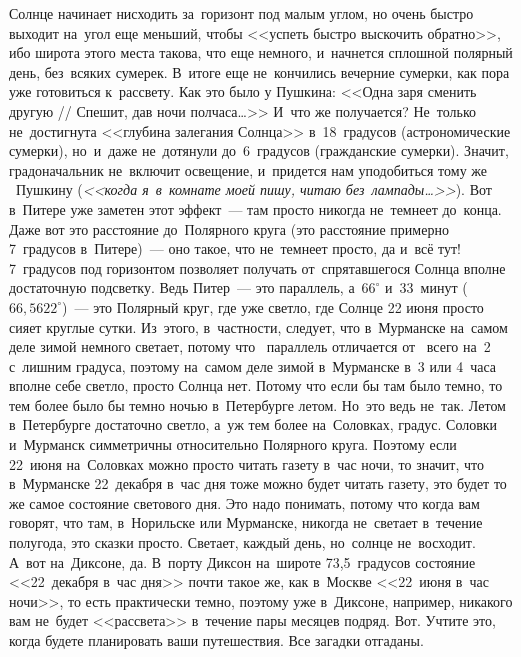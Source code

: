 Солнце начинает нисходить за~горизонт под малым углом, но очень быстро выходит на~угол еще меньший,
чтобы <<успеть быстро выскочить обратно>>, ибо широта этого места такова, что еще немного,
и~начнется сплошной полярный день, без~всяких сумерек. В~итоге еще не~кончились вечерние сумерки,
как пора уже готовиться к~рассвету.
Как это было у Пушкина: <<Одна заря сменить другую // Спешит, дав ночи полчаса\ldots>>
 И~что же получается? Не~только не~достигнута <<глубина
залегания Солнца>> в~18~градусов (астрономические сумерки), но~и~даже не~дотянули до~6~градусов
(гражданские сумерки). Значит, градоначальник не~включит освещение, и~придется нам уподобиться тому же ~Пушкину
(\textit{<<когда я~в~комнате моей пишу, читаю без~лампады\ldots>>}).
 Вот в~Питере уже заметен этот
эффект~--- там просто никогда не~темнеет до~конца. Даже вот это расстояние до~Полярного круга (это
расстояние примерно 7~градусов в~Питере)~--- оно такое, что не~темнеет просто, да и~всё тут! 7~градусов
под горизонтом позволяет получать от~спрятавшегося Солнца вполне достаточную подсветку.
Ведь Питер~--- это  параллель, а~$66^{\circ}$ и~33~минут ($66{,}5622^{\circ}$)~--- это Полярный круг, где уже
светло, где Солнце 22 июня просто сияет круглые сутки.
 Из~этого, в~частности, следует, что в~Мурманске
на~самом деле зимой немного светает, потому что ~параллель отличается от~ всего на~2 с~лишним
градуса, поэтому на~самом деле зимой в~Мурманске в~3 или 4~часа вполне себе светло, просто Солнца
нет. Потому что если бы там было темно, то тем более было бы темно ночью в~Петербурге летом. Но~это
ведь не~так. Летом в~Петербурге достаточно светло, а~уж тем более на~Соловках,  градус.
Соловки и~Мурманск симметричны относительно Полярного круга. Поэтому если 22~июня на~Соловках
можно просто читать газету в~час ночи, то значит, что в~Мурманске 22~декабря в~час дня тоже можно
будет читать газету, это будет то же самое состояние светового дня. Это надо понимать, потому что
когда вам говорят, что там, в~Норильске или Мурманске, никогда не~светает в~течение полугода, это
сказки просто. Светает, каждый день, но~солнце не~восходит. А~вот на~Диксоне, да. В~порту Диксон
на~широте 73,5~градусов состояние <<22~декабря в~час дня>> почти такое же, как в~Москве <<22~июня в~час
ночи>>,
 то есть практически темно, поэтому уже в~Диксоне, например, никакого вам не~будет
<<рассвета>> в~течение пары месяцев подряд. Вот. Учтите это, когда будете планировать ваши
путешествия. Все загадки отгаданы.


